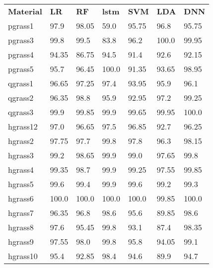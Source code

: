 \begin{table}
	\begin{center}
	\begin{adjustbox}{totalheight=\baselineskip}
		\begin{tabular}{|l|l|l|l|l|l|l|}
		\hline
		\rowcolor{gray!150}
		\rule{0pt}{25pt}\color{white}\textbf{Material} & \color{white}\textbf{LR} & \color{white}\textbf{RF} & \color{white}\textbf{lstm} & \color{white}\textbf{SVM} & \color{white}\textbf{LDA} & \color{white}\textbf{DNN}\\
		pgrass1 & 97.9 & 98.05 & \cellcolor{red!20}59.0 & 95.75 & 96.8 & 95.75\\
		pgrass3 & 99.8 & 99.5 & \cellcolor{red!20}83.8 & 96.2 & 100.0 & 99.95\\
		pgrass4 & \cellcolor{red!20}94.35 & \cellcolor{red!20}86.75 & \cellcolor{red!20}94.5 & \cellcolor{red!20}91.4 & \cellcolor{red!20}92.6 & \cellcolor{red!20}92.15\\
		pgrass5 & 95.7 & 96.45 & 100.0 & \cellcolor{red!20}91.35 & \cellcolor{red!20}93.65 & 98.95\\
		qgrass1 & 96.65 & 97.25 & 97.4 & \cellcolor{red!20}93.95 & 95.9 & 96.1\\
		qgrass2 & 96.35 & 98.8 & 95.9 & \cellcolor{red!20}92.95 & 97.2 & 99.25\\
		qgrass3 & 99.9 & 99.85 & 99.9 & 99.65 & 99.95 & 100.0\\
		hgrass12 & 97.0 & 96.65 & 97.5 & 96.85 & \cellcolor{red!20}92.7 & 96.25\\
		hgrass2 & 97.75 & 97.7 & 99.8 & 97.8 & 96.3 & 98.15\\
		hgrass3 & 99.2 & 98.65 & 99.9 & 99.0 & 97.65 & 99.8\\
		hgrass4 & 99.35 & 98.7 & 99.9 & 99.25 & 97.55 & 99.85\\
		hgrass5 & 99.6 & 99.4 & 99.9 & 99.6 & 99.2 & 99.3\\
		hgrass6 & 100.0 & 100.0 & 100.0 & 100.0 & 99.85 & 100.0\\
		hgrass7 & 96.35 & 96.8 & 98.6 & 95.6 & \cellcolor{red!20}89.85 & 98.6\\
		hgrass8 & 97.6 & 95.45 & 99.8 & \cellcolor{red!20}93.1 & \cellcolor{red!20}87.4 & 98.35\\
		hgrass9 & 97.55 & 98.0 & 99.8 & 95.8 & \cellcolor{red!20}94.05 & 99.1\\
		hgrass10 & 95.4 & \cellcolor{red!20}92.85 & 98.4 & \cellcolor{red!20}94.6 & \cellcolor{red!20}89.9 & \cellcolor{red!20}94.7\\

\end{tabular}
\end{adjustbox}
\end{center}
\end{table}
